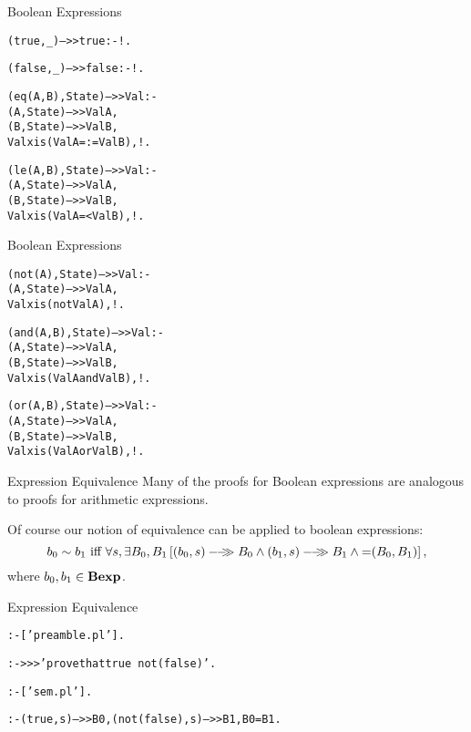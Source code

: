 \documentclass{beamer}
\begin{document}
\begin{frame}[fragile]{Boolean Expressions}
\scriptsize
\begin{alltt}
(true,_) -->> true :- !.               % constants

(false,_) -->> false :- !.             % constants

(eq(A,B),State) -->> Val :-            % equality
    (A,State) -->> ValA,
    (B,State) -->> ValB,
    Val xis (ValA =:= ValB),!.

(le(A,B),State) -->> Val :-            % le
    (A,State) -->> ValA,
    (B,State) -->> ValB,
    Val xis (ValA =< ValB),!.
\end{alltt}
\end{frame}

\begin{frame}[fragile]{Boolean Expressions}
\scriptsize
\begin{alltt}
% Note: we introduce new terms for the Prolog conjunction, 
% disjunction, and negation.  We could have used the built-in ',' and ';'
% operators but this would make terms difficult to read.

(not(A),State) -->> Val :-             % not
    (A,State) -->> ValA,
    Val xis (not ValA),!.

(and(A,B),State) -->> Val :-           % and
    (A,State) -->> ValA,
    (B,State) -->> ValB,
    Val xis (ValA and ValB),!.

(or(A,B),State) -->> Val :-            % or
    (A,State) -->> ValA,
    (B,State) -->> ValB,
    Val xis (ValA or ValB),!.
\end{alltt}
\end{frame}

\begin{frame}[fragile]{Expression Equivalence}
\small
Many of the proofs for Boolean expressions are analogous to proofs for arithmetic expressions.

\vspace{.1in}

Of course our notion of equivalence can be applied to boolean expressions:
\[
b_0 \sim b_1 \mbox{ iff } \forall s ,\exists B_0,B_1\left[ \sem{(b_0,s)}{B_0}\wedge \sem{(b_1,s)}{B_1} \wedge \mbox{=}(B_0,B_1) \right ],
\]
where $b_0, b_1 \in \mbox{\bf Bexp}$.

\end{frame}

\begin{frame}[fragile]{Expression Equivalence}
\scriptsize
\begin{alltt}
% proof-equiv-bool.pl

:- ['preamble.pl'].

:- >>> 'prove that true ~ not(false)'.

% show that
% (forall s)(exists B0,B1)
%         [(true,s)-->>B0 ^ (not(false)s)-->>B1 ^ =(B0,B1)]

% load semantics
:- ['sem.pl'].

% proof
:- (true,s)-->>B0,(not(false),s)-->>B1,B0=B1.
\end{alltt}
\end{frame}
\end{document}
